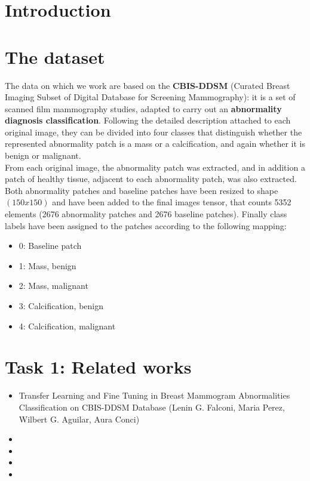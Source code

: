 \documentclass[11pt,a4paper,oneside]{article}
\begin{document}
\baselineskip 22pt


\tableofcontents\thispagestyle{empty}\clearpage

\section{Introduction}
\baselineskip 12pt

\section{The dataset}
The data on which we work are based on the \textbf{CBIS-DDSM} (Curated Breast Imaging Subset of Digital Database for Screening Mammography): it is a set of scanned film mammography studies, adapted to carry out an \textbf{abnormality diagnosis classification}. Following the detailed description attached to each original image, they can be divided into four classes that distinguish whether the represented abnormality patch is a mass or a calcification, and again whether it is benign or malignant. \\
From each original image, the abnormality patch was extracted, and in addition a patch of healthy tissue, adjacent to each abnormality patch, was also extracted. Both abnormality patches and baseline patches have been resized to shape $(150x150)$ and have been added to the final images tensor, that counts 5352 elements (2676 abnormality patches and 2676 baseline patches).
Finally class labels have been assigned to the patches according to the following mapping:
\begin{itemize}
\item 0: Baseline patch
\item 1: Mass, benign
\item 2: Mass, malignant
\item 3: Calcification, benign
\item 4: Calcification, malignant
\end{itemize}

\section{Task 1: Related works}
\begin{itemize}
\item Transfer Learning and Fine Tuning in Breast Mammogram Abnormalities Classification on CBIS-DDSM Database (Lenin G. Falconi, Maria Perez, Wilbert G. Aguilar, Aura Conci)
\item 
\item 
\item 
\item 
\end{itemize}
\end{document}
